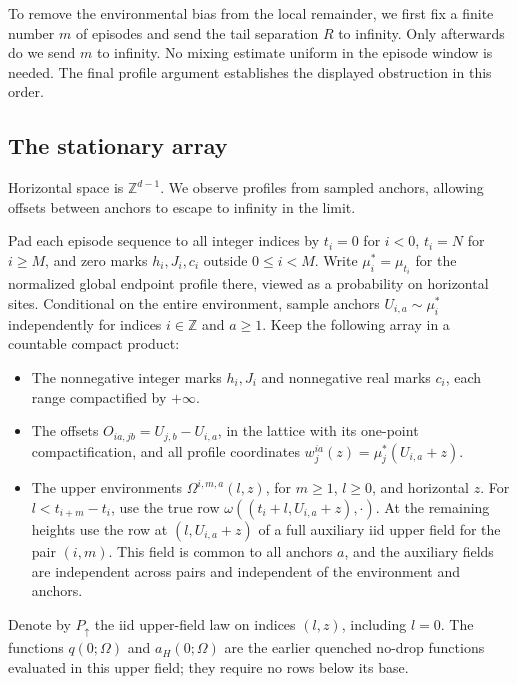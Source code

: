 To remove the environmental bias from the local remainder, we first fix
a finite number \(m\) of episodes and send the tail separation \(R\)
to infinity. Only afterwards do we send \(m\) to infinity. No mixing
estimate uniform in the episode window is needed. The final profile
argument establishes the displayed obstruction in this order.

\subsection{The stationary array}


Horizontal space is \(\mathbb Z^{d-1}\). We observe profiles from sampled
anchors, allowing offsets between anchors to escape to infinity in the
limit.

Pad each episode sequence to all integer indices by \(t_i=0\) for \(i<0\), \(t_i=N\) for \(i\ge M\), and zero marks \(h_i,J_i,c_i\) outside \(0\le i<M\). Write \(\mu_i^*=\mu_{t_i}\) for the normalized global endpoint profile there, viewed as a probability on horizontal sites. Conditional on the entire environment, sample anchors \(U_{i,a}\sim\mu_i^*\) independently for indices \(i\in\mathbb Z\) and \(a\ge1\). Keep the following array in a countable compact product:
\begin{itemize}
\item The nonnegative integer marks \(h_i,J_i\) and nonnegative real marks
\(c_i\), each range compactified by \(+\infty\).
\item The offsets \(O_{ia,jb}=U_{j,b}-U_{i,a}\), in the lattice with its
one-point compactification, and all profile coordinates
\(w_j^{ia}(z)=\mu_j^*(U_{i,a}+z)\).
\item The upper environments \(\Omega^{i,m,a}(l,z)\), for \(m\ge1\),
\(l\ge0\), and horizontal \(z\). For \(l<t_{i+m}-t_i\), use the true row
\(\omega((t_i+l,U_{i,a}+z),\cdot)\). At the remaining heights use the
row at \((l,U_{i,a}+z)\) of a full auxiliary iid upper field for the
pair \((i,m)\). This field is common to all anchors \(a\), and the
auxiliary fields are independent across pairs and independent of the
environment and anchors.
\end{itemize}
Denote by \(P_\uparrow\) the iid upper-field law on indices \((l,z)\),
including \(l=0\). The functions \(q(0;\Omega)\) and
\(a_H(0;\Omega)\) are the earlier quenched no-drop functions evaluated
in this upper field; they require no rows below its base.


